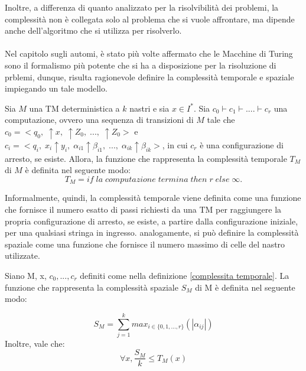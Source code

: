   Inoltre, a differenza di quanto analizzato per la risolvibilità dei problemi, la complessità non è collegata solo al problema che si vuole affrontare, ma dipende anche dell'algoritmo che si utilizza per risolverlo. 

  \paragraph{}
  Nel capitolo sugli automi, è stato più volte affermato che le Macchine di Turing sono il formalismo più potente che si ha a disposizione per la risoluzione di prblemi, dunque, risulta ragionevole definire la complessità temporale e spaziale impiegando un tale modello.

  \begin{definition} \label{complessita temporale} 
    Sia \(M\) una TM deterministica a \(k\) nastri e sia \(x\in I^*\). Sia \(c_0\vdash c_1\vdash....\vdash c_r\) una computazione, ovvero una sequenza di transizioni di \(M\) tale che \(c_0=<q_0,\;\!\uparrow\! x,\; \!\uparrow\! Z_0,\; ...,\; \!\uparrow\! Z_0>\) e \\ \(c_i=<q_i,\;x_i\!\uparrow\! y_i,\; \alpha_{i1}\!\uparrow\! \beta_{i1},\; ...,\; \alpha_{ik}\!\uparrow\! \beta_{ik}>\), in cui \(c_r\) è una configurazione di arresto, se esiste. Allora, la funzione che rappresenta la complessità temporale \({T}_M\) di \(M\) è definita nel seguente modo:
    \begin{equation*}
      {T}_M=if\;la\;computazione\;termina\;then\;r\;else\;\infty.
    \end{equation*}
  \end{definition}

  Informalmente, quindi, la complessità temporale viene definita come una funzione che fornisce il numero esatto di passi richiesti da una TM per raggiungere la propria configurazione di arresto, se esiste, a partire dalla configurazione iniziale, per una qualsiasi stringa in ingresso. analogamente, si può definire la complessità spaziale come una funzione che fornisce il numero massimo di celle del nastro utilizzate.

  \begin{definition} \label{complessita spaziale}
    Siano M, x, \(c_0,...,c_r\) definiti come nella definizione \ref{complessita temporale}. La funzione che rappresenta la complessità spaziale \({S}_M\) di M è definita nel seguente modo:

    \begin{equation*}
      \displaystyle {S}_M=\sum_{j=1}^{k} max_{i\in\{0,1,...,r\}}(|\alpha_{ij}|)
    \end{equation*}
    Inoltre, vale che:
    \begin{equation*}
      \forall x, \frac{{S}_M}{k}\le {T}_M(x)
    \end{equation*}
  \end{definition}

